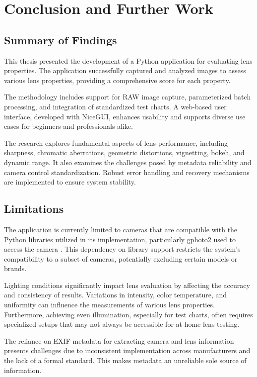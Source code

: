 \chapter{Conclusion and Further Work}
\section{Summary of Findings}
This thesis presented the development of a Python application for evaluating lens properties. The application successfully captured and analyzed images to assess various lens properties, providing a comprehensive score for each property. %

The methodology includes support for RAW image capture, parameterized batch processing, and integration of standardized test charts. A web-based user interface, developed with NiceGUI, enhances usability and supports diverse use cases for beginners and professionals alike.

The research explores fundamental aspects of lens performance, including sharpness, chromatic aberrations, geometric distortions, vignetting, bokeh, and dynamic range. It also examines the challenges posed by metadata reliability and camera control standardization. Robust error handling and recovery mechanisms are implemented to ensure system stability.

\section{Limitations}
The application is currently limited to cameras that are compatible with the Python libraries utilized in its implementation, particularly gphoto2 used to access the camera \cite{gphoto2_compatible}. This dependency on library support restricts the system’s compatibility to a subset of cameras, potentially excluding certain models or brands.

Lighting conditions significantly impact lens evaluation by affecting the accuracy and consistency of results. Variations in intensity, color temperature, and uniformity can influence the measurements of various lens properties. Furthermore, achieving even illumination, especially for test charts, often requires specialized setups that may not always be accessible for at-home lens testing.

The reliance on EXIF metadata for extracting camera and lens information presents challenges due to inconsistent implementation across manufacturers and the lack of a formal standard. This makes metadata an unreliable sole source of information.

